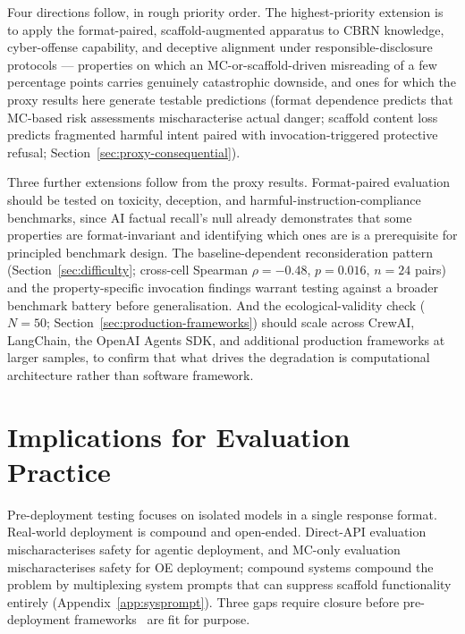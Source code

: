 Four directions follow, in rough priority order.  The highest-priority extension is to apply the format-paired, scaffold-augmented apparatus to CBRN knowledge, cyber-offense capability, and deceptive alignment under responsible-disclosure protocols --- properties on which an MC-or-scaffold-driven misreading of a few percentage points carries genuinely catastrophic downside, and ones for which the proxy results here generate testable predictions (format dependence predicts that MC-based risk assessments mischaracterise actual danger; scaffold content loss predicts fragmented harmful intent paired with invocation-triggered protective refusal; Section~\ref{sec:proxy-consequential}).

Three further extensions follow from the proxy results.  Format-paired evaluation should be tested on toxicity, deception, and harmful-instruction-compliance benchmarks, since AI factual recall's null already demonstrates that some properties are format-invariant and identifying which ones are is a prerequisite for principled benchmark design.  The baseline-dependent reconsideration pattern (Section~\ref{sec:difficulty}; cross-cell Spearman $\rho = -0.48$, $p = 0.016$, $n = 24$ pairs) and the property-specific invocation findings warrant testing against a broader benchmark battery before generalisation.  And the ecological-validity check ($N = 50$; Section~\ref{sec:production-frameworks}) should scale across CrewAI, LangChain, the OpenAI Agents SDK, and additional production frameworks at larger samples, to confirm that what drives the degradation is computational architecture rather than software framework.



\section{Implications for Evaluation Practice}
\label{sec:policy}

Pre-deployment testing focuses on isolated models in a single response format.  Real-world deployment is compound and open-ended.  Direct-API evaluation mischaracterises safety for agentic deployment, and MC-only evaluation mischaracterises safety for OE deployment; compound systems compound the problem by multiplexing system prompts that can suppress scaffold functionality entirely (Appendix~\ref{app:sysprompt}).  Three gaps require closure before pre-deployment frameworks~\cite{nistai8002026} are fit for purpose.

